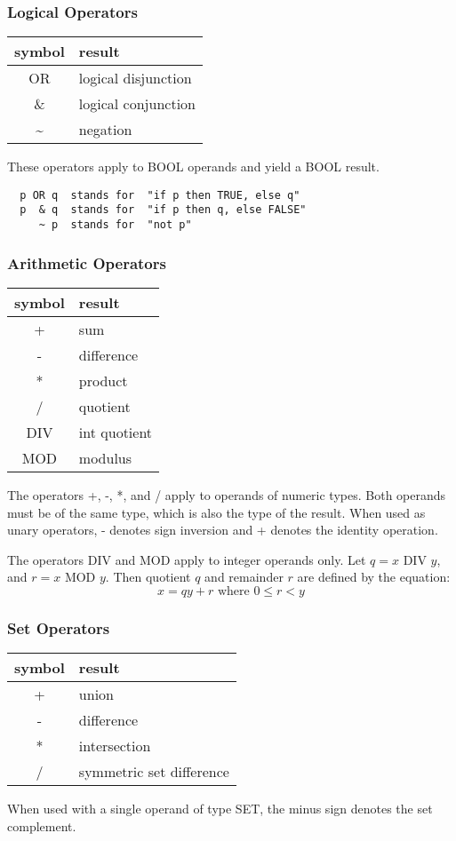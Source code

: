 \subsubsection{Logical Operators}
\begin{table}[h!]
  \centering
  \begin{tabular}{c l}
    symbol & result \\\hline
    OR   & logical disjunction \\
    \&   & logical conjunction \\
    \~{} & negation
  \end{tabular}
\end{table}
These operators apply to BOOL operands and yield a BOOL result.
\begin{verbatim}
  p OR q  stands for  "if p then TRUE, else q"
  p  & q  stands for  "if p then q, else FALSE"
     ~ p  stands for  "not p"
\end{verbatim}

\subsubsection{Arithmetic Operators}
\begin{table}[h!]
  \centering
  \begin{tabular}{c l}
    symbol & result \\\hline
    +   & sum \\
    -   & difference \\
    *   & product \\
    /   & quotient \\
    DIV & int quotient \\
    MOD & modulus
  \end{tabular}
\end{table}
The operators +, -, *, and / apply to operands of numeric types. Both operands must be of
the same type, which is also the type of the result. When used as unary operators, -
denotes sign inversion and + denotes the identity operation.

The operators DIV and MOD apply to integer operands only. Let $q = x\text{ DIV }y$, and
$r = x\text{ MOD }y$.  Then quotient $q$ and remainder $r$ are defined by the equation:
\[ x = qy + r\text{  where }0 \le r < y \]

\subsubsection{Set Operators}
\begin{table}[h!]
  \centering
  \begin{tabular}{c l}
    symbol & result \\\hline
    + & union \\
    - & difference \\
    * & intersection \\
    / & symmetric set difference
  \end{tabular}
\end{table}
When used with a single operand of type SET, the minus sign denotes the set complement.

